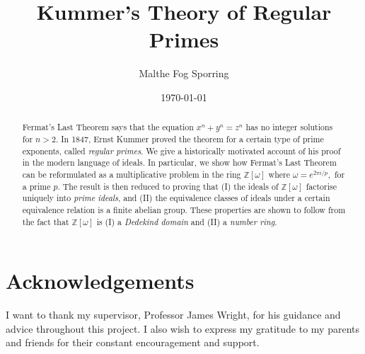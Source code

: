 \documentclass[12pt,oneside]{report}
\title{Kummer's Theory of Regular Primes}
\author{Malthe Fog Sporring}
\date{\today}
\numberwithin{thm}{section}
\theoremstyle{plain}
\theoremstyle{definition}
\newcommand{\Z}{\mathbb{Z}}
\begin{document}
\maketitle

\begin{abstract} Fermat's Last Theorem says that the equation $x^n+y^n=z^n$ has no integer solutions for $n>2$. In 1847, Ernst Kummer proved the theorem for a certain type of prime exponents, called \textit{regular primes}. We give a historically motivated account of his proof in the modern language of ideals. In particular, we show how Fermat's Last Theorem can be reformulated as a multiplicative problem in the ring $\Z[\omega]$ where $\omega=e^{2\pi i/p},$ for a prime $p$. The result is then reduced to proving that (I) the ideals of $\Z[\omega]$ factorise uniquely into \textit{prime ideals}, and (II) the equivalence classes of ideals under a certain equivalence relation is a finite abelian group. These properties are shown to follow from the fact that $\Z[\omega]$ is (I) a \textit{Dedekind domain} and (II) a \textit{number ring}.
\end{abstract}
\declaration
\dedication{To Phoebe.}
\tableofcontents
\newpage
{}
\chapter*{Acknowledgements}
I want to thank my supervisor, Professor James Wright, for his guidance and advice throughout this project. I also wish to express my gratitude to my parents and friends for their constant encouragement and support.

\newpage{}






\newpage
{}

\end{document}
